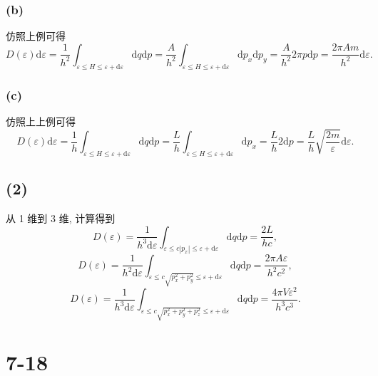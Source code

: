 \documentclass[
    lang=cn,
    column=onecolumn
]{spArticle}
\begin{document}
            \subsubsection{(b)}
                仿照上例可得
                $$
                D\left( \varepsilon \right) \mathrm{d}\varepsilon =\frac{1}{h^2}\int_{\varepsilon \le H\le \varepsilon +\mathrm{d}\varepsilon}{\mathrm{d}q\mathrm{d}p}=\frac{A}{h^2}\int_{\varepsilon \le H\le \varepsilon +\mathrm{d}\varepsilon}{\mathrm{d}p_x\mathrm{d}p_y}=\frac{A}{h^2}2\pi p\mathrm{d}p=\frac{2\pi Am}{h^2}\mathrm{d}\varepsilon .
                $$
            \subsubsection{(c)}
                仿照上上例可得
                $$
                D\left( \varepsilon \right) \mathrm{d}\varepsilon =\frac{1}{h}\int_{\varepsilon \le H\le \varepsilon +\mathrm{d}\varepsilon}{\mathrm{d}q\mathrm{d}p}=\frac{L}{h}\int_{\varepsilon \le H\le \varepsilon +\mathrm{d}\varepsilon}{\mathrm{d}p_x}=\frac{L}{h}2\mathrm{d}p=\frac{L}{h}\sqrt{\frac{2m}{\varepsilon}}\mathrm{d}\varepsilon .
                $$
        \subsection{(2)}
            从 1 维到 3 维, 计算得到
            $$
            D\left( \varepsilon \right) =\frac{1}{h^3\mathrm{d}\varepsilon}\int_{\varepsilon \le c\left| p_x \right|\le \varepsilon +\mathrm{d}\varepsilon}{\mathrm{d}q\mathrm{d}p}=\frac{2L}{hc},
            $$
            $$
            D\left( \varepsilon \right) =\frac{1}{h^2\mathrm{d}\varepsilon}\int_{\varepsilon \le c\sqrt{p_{x}^{2}+p_{y}^{2}}\le \varepsilon +\mathrm{d}\varepsilon}{\mathrm{d}q\mathrm{d}p}=\frac{2\pi A\varepsilon}{h^2c^2},
            $$
            $$
            D\left( \varepsilon \right) =\frac{1}{h^3\mathrm{d}\varepsilon}\int_{\varepsilon \le c\sqrt{p_{x}^{2}+p_{y}^{2}+p_{z}^{2}}\le \varepsilon +\mathrm{d}\varepsilon}{\mathrm{d}q\mathrm{d}p}=\frac{4\pi V\varepsilon ^2}{h^3c^3}.
            $$

    \section{7-18}
\end{document}
